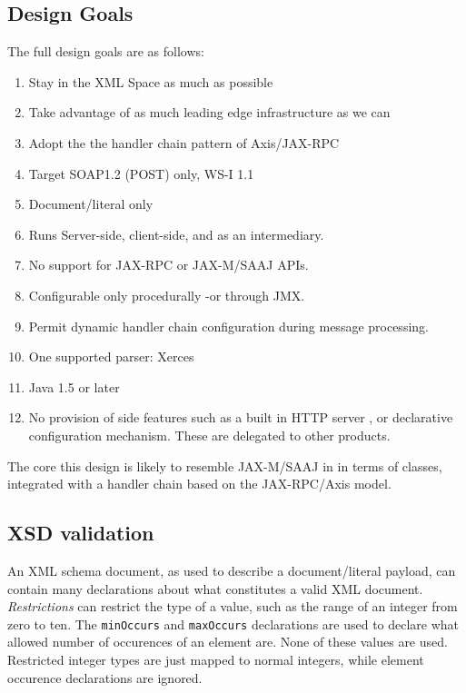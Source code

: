 \subsection{Design Goals}
\label{alpine:design}

The full design goals are as follows:

\begin{enumerate}

\item Stay in the XML Space as much as possible
\item Take advantage of as much leading edge infrastructure as we can
\item Adopt the the handler chain pattern of Axis/JAX-RPC
\item Target SOAP1.2 (POST) only, WS-I 1.1
\item Document/literal only
\item Runs Server-side, client-side, and as an intermediary. 
\item No support for JAX-RPC or JAX-M/SAAJ APIs.
\item Configurable only procedurally -or through JMX.
\item Permit dynamic handler chain configuration during message processing.
\item One supported parser: Xerces
\item Java 1.5 or later 

\item No provision of side features such as a built in HTTP server , or
declarative configuration mechanism. These are delegated to other products.
\end{enumerate}

The core this design is likely to resemble JAX-M/SAAJ in in terms of classes,
integrated with a handler chain based on the JAX-RPC/Axis model.  


\subsection{XSD validation}
\label{alpine:validation}
An XML schema document, as used to describe a document/literal
payload, can contain many declarations about what constitutes a valid
XML document. \emph{Restrictions} can restrict the type of a value,
such as the range of an integer from zero to ten. The \verb|minOccurs|
and \verb|maxOccurs| declarations are used to declare what allowed
number of occurences of an element are. None of these values are
used. Restricted integer types are just mapped to normal integers,
while element occurence declarations are ignored.

